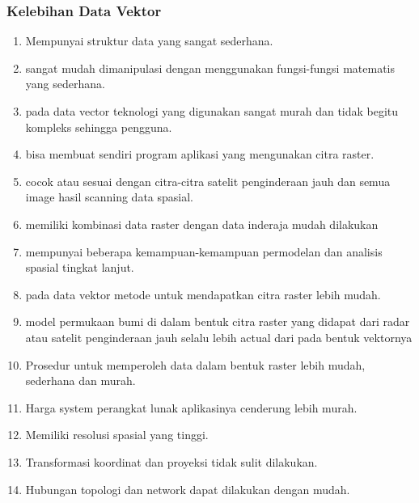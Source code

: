 \begin{enumerate}
\subsubsection{Kelebihan Data Vektor}
\begin{enumerate}
Kelebihan data vektor di bandingkan data raster
data vektor relatif lebih ekonomis dalam hal ukuran file dan presisi dalam lokasi, tetapi sangat sulit untuk digunakan dalam komputasi matematik. 
\item Mempunyai struktur data yang sangat sederhana.
\item sangat mudah dimanipulasi dengan menggunakan fungsi-fungsi matematis yang sederhana.
\item pada data vector teknologi yang digunakan sangat  murah dan tidak begitu kompleks sehingga pengguna.
\item bisa membuat sendiri program aplikasi yang mengunakan citra raster.
\item cocok atau sesuai dengan citra-citra satelit penginderaan jauh dan semua image hasil scanning data spasial.
\item  memiliki kombinasi data raster dengan data inderaja mudah dilakukan
\item mempunyai beberapa kemampuan-kemampuan permodelan dan analisis spasial tingkat lanjut.
\item pada data vektor metode untuk mendapatkan citra raster lebih mudah.
\item model permukaan bumi di dalam bentuk citra raster yang didapat dari radar atau satelit penginderaan jauh selalu lebih actual dari pada bentuk vektornya
\item Prosedur untuk memperoleh data dalam bentuk raster lebih mudah, sederhana dan murah.
\item Harga system perangkat lunak aplikasinya cenderung lebih murah.
\item Memiliki resolusi spasial yang tinggi.
\item Transformasi koordinat dan proyeksi tidak sulit dilakukan.
\item Hubungan topologi dan network dapat dilakukan dengan mudah.
\end{enumerate}


\end{enumerate}
